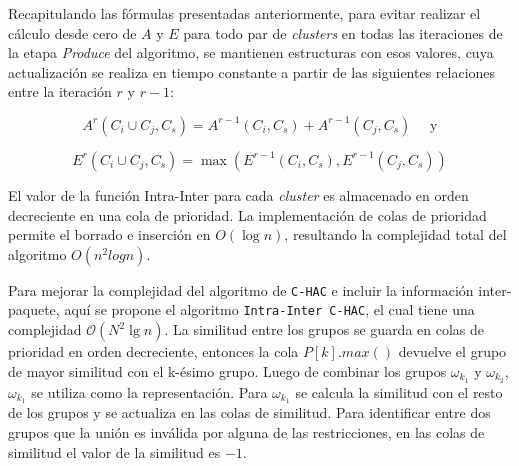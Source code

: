 Recapitulando las fórmulas presentadas anteriormente, para evitar realizar el cálculo desde cero de $A$ y $E$ para todo par de {\em clusters} en todas las iteraciones de la etapa \emph{Produce} del algoritmo, se  mantienen estructuras con esos valores, cuya actualización se realiza en tiempo constante a partir de las siguientes relaciones entre la iteración $r$ y $r-1$:

$$A^r(C_i \cup C_j, C_s) = A^{r-1}(C_i,C_s) + A^{r-1}(C_j,C_s) \quad \mbox{ y}$$

$$E^r(C_i \cup C_j,C_s) = \max (E^{r-1}(C_i,C_s),E^{r-1}(C_j,C_s))$$

El valor de la función Intra-Inter para cada {\em cluster} es almacenado en orden decreciente en una cola de prioridad. La implementación de colas de prioridad permite el borrado e inserción en $O(\log n)$, resultando la complejidad total del algoritmo $O(n^2 log n)$.

Para mejorar la complejidad del algoritmo de \texttt{C-HAC} e incluir la información inter-paquete, aquí se propone el algoritmo \texttt{Intra-Inter C-HAC}, el cual tiene una complejidad $\mathcal{O}(N^{2}\lg n)$. La similitud entre los grupos se guarda en colas de prioridad en orden decreciente, entonces la cola $P\left[k\right].max()$ devuelve el grupo de mayor similitud con el k-ésimo grupo. Luego de combinar los grupos $\omega_{k_{1}}$ y $\omega_{k_{2}}$, $\omega_{k_{1}}$ se utiliza como la representación. Para $\omega_{k_{1}}$ se calcula la similitud con el resto de los grupos y se actualiza en las colas de similitud. Para identificar entre dos grupos que la unión es inválida por alguna de las restricciones, en las colas de similitud el valor de la similitud es $-1$.

